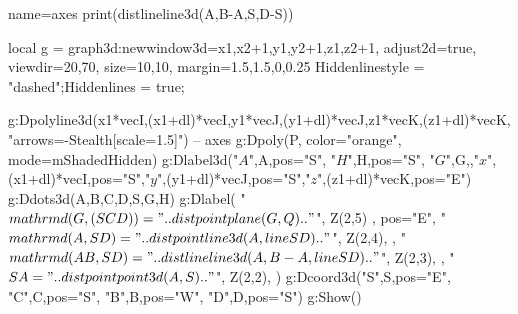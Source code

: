\documentclass{standalone}
\begin{document}
\begin{luadraw}{name=axes}
print(distlineline3d({A,B-A},{S,D-S}))

local g = graph3d:new{window3d={x1,x2+1,y1,y2+1,z1,z2+1}, adjust2d=true, viewdir={20,70}, size={10,10}, margin={1.5,1.5,0,0.25}}
Hiddenlinestyle = "dashed";Hiddenlines = true;

g:Dpolyline3d({{x1*vecI,(x1+dl)*vecI},{y1*vecJ,(y1+dl)*vecJ},{z1*vecK,(z1+dl)*vecK}}, "arrows={-Stealth[scale=1.5]}") -- axes
g:Dpoly(P, {color="orange", mode=mShadedHidden})
 g:Dlabel3d("$A$",A,{pos="S"}, "$H$",H,{pos="S"}, "$G$",G,{},"$x$",(x1+dl)*vecI,{pos="S"},"$y$",(y1+dl)*vecJ,{pos="S"},"$z$",(z1+dl)*vecK,{pos="E"})
g:Ddots3d({A,B,C,D,S,G,H})
g:Dlabel( "$\\mathrm d(G,(SCD))="..distpointplane(G,Q).."$", Z(2,5) , {pos="E"},
    "$\\mathrm d(A,SD)="..distpointline3d(A,lineSD).."$", Z(2,4), {},
    "$\\mathrm d(AB,SD)="..distlineline3d({A,B-A},lineSD).."$", Z(2,3), {},
    "$SA="..distpointpoint3d(A,S).."$", Z(2,2), {})
g:Dcoord3d("S",S,{pos="E"}, "C",C,{pos="S"}, "B",B,{pos="W"}, "D",D,{pos="S"})
g:Show()
\end{luadraw}
\end{document}
